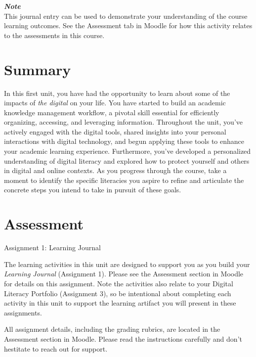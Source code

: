 \documentclass[
]{book}
\theoremstyle{definition}
\theoremstyle{definition}
\theoremstyle{definition}
\theoremstyle{definition}
\theoremstyle{remark}
\begin{document}
\begin{feedback}
\textbf{\emph{Note}}\\
This journal entry can be used to demonstrate your understanding of the
course learning outcomes. See the Assessment tab in Moodle for how this
activity relates to the assessments in this course.
\end{feedback}

\hypertarget{summary}{%
\section*{Summary}\label{summary}}

In this first unit, you have had the opportunity to learn about some of the impacts of \emph{the digital} on your life. You have started to build an academic knowledge management workflow, a pivotal skill essential for efficiently organizing, accessing, and leveraging information. Throughout the unit, you've actively engaged with the digital tools, shared insights into your personal interactions with digital technology, and begun applying these tools to enhance your academic learning experience. Furthermore, you've developed a personalized understanding of digital literacy and explored how to protect yourself and others in digital and online contexts. As you progress through the course, take a moment to identify the specific literacies you aspire to refine and articulate the concrete steps you intend to take in pursuit of these goals.

\hypertarget{assessment}{%
\section*{Assessment}\label{assessment}}

\begin{assessment}
{Assignment 1: Learning Journal}

The learning activities in this unit are designed to support you as you build your \emph{Learning Journal} (Assignment 1). Please see the Assessment section in Moodle for details on this assignment. Note the activities also relate to your Digital Literacy Portfolio (Assignment 3), so be intentional about completing each activity in this unit to support the learning artifact you will present in these assignments.

All assignment details, including the grading rubrics, are located in the Assessment section in Moodle. Please read the instructions carefully and don't hestitate to reach out for support.
\end{assessment}
\end{document}

